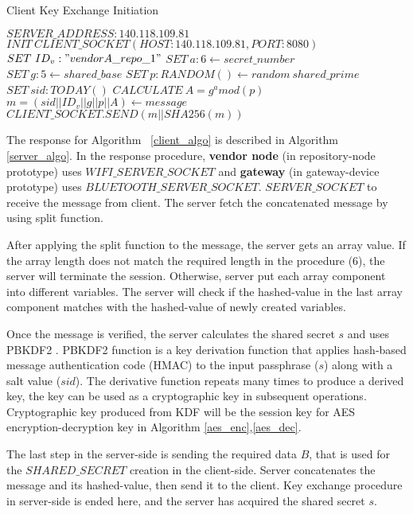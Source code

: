 \begin{algorithm}[H]
	\caption{Client Key Exchange Initiation}\label{client_algo}
	\begin{algorithmic}[1]
		\State $SERVER\_ADDRESS:140.118.109.81$
		\State $INIT\ CLIENT\_SOCKET(HOST:140.118.109.81,PORT:8080)$
		\State $SET\ ID_v:"vendorA\_repo\_1"$
		\State $SET\ a:6 \gets secret\_number$
		\State $SET\ g:5 \gets shared\_base$
		\State $SET\ p:RANDOM() \gets random\ shared\_prime$
		\State $SET\ sid:TODAY()$
		\State $CALCULATE\ A=g^amod(p)$
		\State $m=(sid||ID_v||g||p||A) \gets message$
		\State $CLIENT\_SOCKET.SEND(m||SHA256(m))$
		\EndProcedure
	\end{algorithmic}
\end{algorithm}

The response for Algorithm ~\ref{client_algo} is described in Algorithm \ref{server_algo}. In the response procedure, \textbf{vendor node} (in repository-node prototype) uses $WIFI\_SERVER\_SOCKET$ and \textbf{gateway} (in gateway-device prototype) uses $BLUETOOTH\_SERVER\_SOCKET$. $SERVER\_SOCKET$ to receive the message from client. The server fetch the concatenated message by using split function. 

After applying the split function to the message, the server gets an array value. If the array length does not match the required length in the procedure (6), the server will terminate the session. Otherwise, server put each array component into different variables. The server will check if the hashed-value in the last array component matches with the hashed-value of newly created variables.

Once the message is verified, the server calculates the shared secret $s$ and uses PBKDF2 \cite{wiki:pbkdf2}. PBKDF2 function is a key derivation function that applies hash-based message authentication code (HMAC) to the input passphrase ($s$) along with a salt value ($sid$). The derivative function repeats many times to produce a derived key, the key can be used as a cryptographic key in subsequent operations. Cryptographic key produced from KDF will be the session key for AES encryption-decryption key in Algorithm \ref{aes_enc},\ref{aes_dec}.

The last step in the server-side is sending the required data $B$, that is used for the $SHARED\_SECRET$ creation in the client-side. Server concatenates the message and its hashed-value, then send it to the client. Key exchange procedure in server-side is ended here, and the server has acquired the shared secret $s$.

